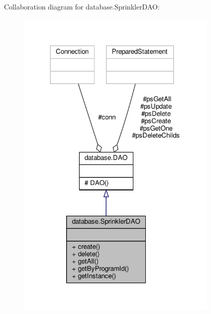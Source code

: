 Collaboration diagram for database.\-Sprinkler\-D\-A\-O\-:\nopagebreak
\begin{figure}[H]
\begin{center}
\leavevmode
\includegraphics[width=276pt]{classdatabase_1_1SprinklerDAO__coll__graph}
\end{center}
\end{figure}
